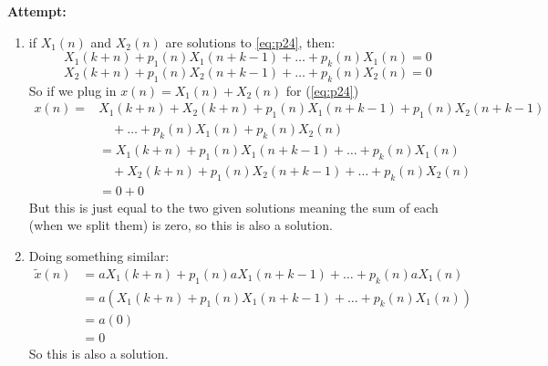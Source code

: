 \documentclass[12pt,letterpaper]{article}
\theoremstyle{definition}
\begin{document}


\textbf{Attempt:}

\begin{changemargin}{.5cm}{0cm}
    \begin{enumerate}
        \item    
   if $X_1(n)$ and $X_2(n)$ are solutions to \ref{eq:p24}, then:
   \begin{equation*}
    X_1(k+n) + p_1(n) X_1(n+k-1)+\dots +p_k(n)X_1(n)=0
   \end{equation*}
   \begin{equation*}
    X_2(k+n) + p_1(n) X_2(n+k-1)+\dots +p_k(n)X_2(n)=0
   \end{equation*}
   So if we plug in $x(n) = X_1(n) + X_2(n)$ for (\ref{eq:p24})
   \begin{align*}
    x(n)=&X_1(k+n)+X_2(k+n) + p_1(n) X_1(n+k-1)+p_1(n)X_2(n+k-1)\\
    &\quad+\dots +p_k(n)X_1(n)+p_k(n)X_2(n)\\
    &=X_1(k+n) + p_1(n) X_1(n+k-1)+\dots +p_k(n)X_1(n) \\
    &\quad+X_2(k+n) + p_1(n) X_2(n+k-1)+\dots +p_k(n)X_2(n)\\
    &=0 +0
   \end{align*}
    But this is just equal to the two given solutions meaning the sum of each (when we split them) is zero, so this is also a solution.
    \item  Doing something similar:
    \begin{align*}
        \tilde{x}(n) &= aX_1(k+n) + p_1(n) aX_1(n+k-1)+\dots +p_k(n)aX_1(n)\\
        &=a(X_1(k+n) + p_1(n) X_1(n+k-1)+\dots +p_k(n)X_1(n))\\
        &=a(0)\\
        &=0
    \end{align*}
    So this is also a solution.
\end{enumerate}
\end{changemargin}
\end{document}
